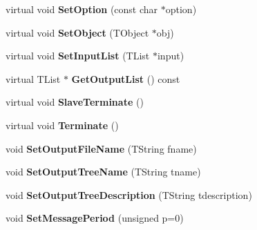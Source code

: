 \begin{DoxyCompactItemize}
\item 
\hypertarget{class_h_a_l_1_1_analysis_selector_a8e8f2ff599b95b4ea1437080f7a243e2}{virtual void {\bfseries Set\+Option} (const char $\ast$option)}\label{class_h_a_l_1_1_analysis_selector_a8e8f2ff599b95b4ea1437080f7a243e2}

\item 
\hypertarget{class_h_a_l_1_1_analysis_selector_a6c5b330612cbb40740a1773322f1bd4c}{virtual void {\bfseries Set\+Object} (T\+Object $\ast$obj)}\label{class_h_a_l_1_1_analysis_selector_a6c5b330612cbb40740a1773322f1bd4c}

\item 
\hypertarget{class_h_a_l_1_1_analysis_selector_a2ad21fe9c786a8b8ed9d2f2ed03b18dd}{virtual void {\bfseries Set\+Input\+List} (T\+List $\ast$input)}\label{class_h_a_l_1_1_analysis_selector_a2ad21fe9c786a8b8ed9d2f2ed03b18dd}

\item 
\hypertarget{class_h_a_l_1_1_analysis_selector_af839fdbf6d731039f3dfe2a28435cfa0}{virtual T\+List $\ast$ {\bfseries Get\+Output\+List} () const }\label{class_h_a_l_1_1_analysis_selector_af839fdbf6d731039f3dfe2a28435cfa0}

\item 
\hypertarget{class_h_a_l_1_1_analysis_selector_a83767cc68a8016682064a673b4cd3a81}{virtual void {\bfseries Slave\+Terminate} ()}\label{class_h_a_l_1_1_analysis_selector_a83767cc68a8016682064a673b4cd3a81}

\item 
\hypertarget{class_h_a_l_1_1_analysis_selector_a8b660b6a333cdefd12e1829389fbf0cd}{virtual void {\bfseries Terminate} ()}\label{class_h_a_l_1_1_analysis_selector_a8b660b6a333cdefd12e1829389fbf0cd}

\item 
\hypertarget{class_h_a_l_1_1_analysis_selector_a65b63a6f47a198031436edbea7818b1b}{void {\bfseries Set\+Output\+File\+Name} (T\+String fname)}\label{class_h_a_l_1_1_analysis_selector_a65b63a6f47a198031436edbea7818b1b}

\item 
\hypertarget{class_h_a_l_1_1_analysis_selector_a03cb0fb32fb595a20183a10651811a10}{void {\bfseries Set\+Output\+Tree\+Name} (T\+String tname)}\label{class_h_a_l_1_1_analysis_selector_a03cb0fb32fb595a20183a10651811a10}

\item 
\hypertarget{class_h_a_l_1_1_analysis_selector_ab1610526942d045e9bc1b2e4006575a5}{void {\bfseries Set\+Output\+Tree\+Description} (T\+String tdescription)}\label{class_h_a_l_1_1_analysis_selector_ab1610526942d045e9bc1b2e4006575a5}

\item 
\hypertarget{class_h_a_l_1_1_analysis_selector_a1e12ce6668b8f66ee0590dab7d9a6904}{void {\bfseries Set\+Message\+Period} (unsigned p=0)}\label{class_h_a_l_1_1_analysis_selector_a1e12ce6668b8f66ee0590dab7d9a6904}

\end{DoxyCompactItemize}

